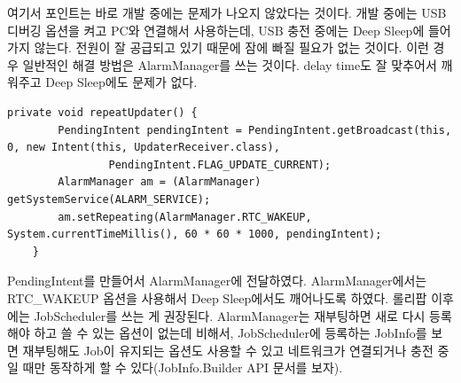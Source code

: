 여기서 포인트는 바로 개발 중에는 문제가 나오지 않았다는 것이다.
개발 중에는 USB 디버깅 옵션을 켜고 PC와 연결해서 사용하는데, USB 충전 중에는 Deep Sleep에 들어가지 않는다. 
전원이 잘 공급되고 있기 때문에 잠에 빠질 필요가 없는 것이다.
이런 경우 일반적인 해결 방법은 AlarmManager를 쓰는 것이다. delay time도 잘 맞추어서 깨워주고 Deep Sleep에도 문제가 없다.
\begin{lstlisting}[frame=single]
	private void repeatUpdater() {
		PendingIntent pendingIntent = PendingIntent.getBroadcast(this, 0, new Intent(this, UpdaterReceiver.class),  
				PendingIntent.FLAG_UPDATE_CURRENT);
		AlarmManager am = (AlarmManager) getSystemService(ALARM_SERVICE);
		am.setRepeating(AlarmManager.RTC_WAKEUP, System.currentTimeMillis(), 60 * 60 * 1000, pendingIntent);
	}
\end{lstlisting}
PendingIntent를 만들어서 AlarmManager에 전달하였다. AlarmManager에서는 RTC\_WAKEUP 옵션을 사용해서 Deep Sleep에서도 깨어나도록 하였다. 
롤리팝 이후에는 JobScheduler를 쓰는 게 권장된다. AlarmManager는 재부팅하면 새로 다시 등록해야 하고 쓸 수 있는 옵션이 없는데 비해서, JobScheduler에 등록하는 JobInfo를 보면 재부팅해도 Job이 유지되는 옵션도 사용할 수 있고 네트워크가 연결되거나 충전 중일 때만 동작하게 할 수 있다(JobInfo.Builder API 문서를 보자).\\

